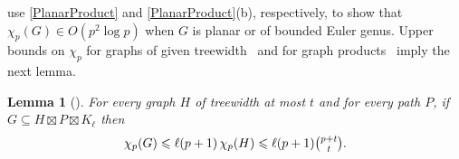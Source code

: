 \documentclass{patmorin}
\theoremstyle{plain}
\newtheorem{lem}[thm]{Lemma}
\theoremstyle{definition}
\newcommand{\note}[2]{\noindent{\color{red}[#1:~#2]}}
\renewcommand{\le}{\leqslant}
\renewcommand{\leq}{\leqslant}
\begin{document}
\citet{DFMS21} use \cref{PlanarProduct} and \cref{PlanarProduct}(b), respectively, to show that $\chi_p(G)\in O(p^2\log p)$ when $G$ is planar or of bounded Euler genus.  Upper bounds on $\chi_p$ for graphs of given treewidth~\citep{PS21} and for graph products~\citep{DFMS21} imply the next lemma.


\begin{lem}[\citep{DFMS21,PS21}]
\label{p-centered}
For every graph $H$ of treewidth at most $t$ and for every path $P$, if $G\subseteq H\boxtimes P \boxtimes K_\ell$ then
\[\chi_p(G)\le \ell (p+1)\, \chi_p(H) \leq \ell (p+1) \tbinom{p+t}{t}.\]
\end{lem}

\end{document}
